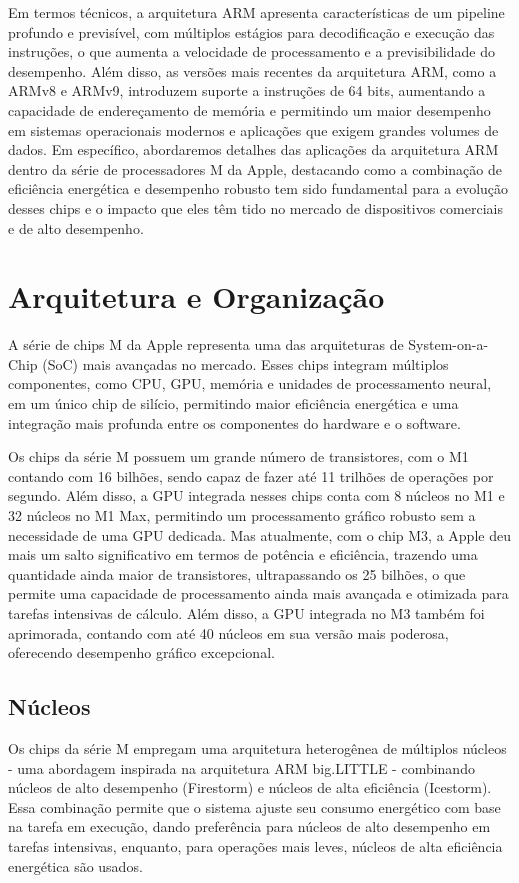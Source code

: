\documentclass[a4paper,times,12pt]{article}
\begin{document}
Em termos técnicos, a arquitetura ARM apresenta características de um pipeline profundo e previsível, com múltiplos estágios para decodificação e execução das instruções, o que aumenta a velocidade de processamento e a previsibilidade do desempenho. Além disso, as versões mais recentes da arquitetura ARM, como a ARMv8 e ARMv9, introduzem suporte a instruções de 64 bits, aumentando a capacidade de endereçamento de memória e permitindo um maior desempenho em sistemas operacionais modernos e aplicações que exigem grandes volumes de dados. Em específico, abordaremos detalhes das aplicações da arquitetura ARM dentro da série de processadores M da Apple, destacando como a combinação de eficiência energética e desempenho robusto tem sido fundamental para a evolução desses chips e o impacto que eles têm tido no mercado de dispositivos comerciais e de alto desempenho.

\newpage
\section{Arquitetura e Organização}
\hspace{+15pt} A série de chips M da Apple representa uma das arquiteturas de System-on-a-Chip (SoC) mais avançadas no mercado. Esses chips integram múltiplos componentes, como CPU, GPU, memória e unidades de processamento neural, em um único chip de silício, permitindo maior eficiência energética e uma integração mais profunda entre os componentes do hardware e o software.

Os chips da série M possuem um grande número de transistores, com o M1 contando com 16 bilhões, sendo capaz de fazer até 11 trilhões de operações por segundo. Além disso, a GPU integrada nesses chips conta com 8 núcleos no M1 e 32 núcleos no M1 Max, permitindo um processamento gráfico robusto sem a necessidade de uma GPU dedicada. Mas atualmente, com o chip M3, a Apple deu mais um salto significativo em termos de potência e eficiência, trazendo uma quantidade ainda maior de transistores, ultrapassando os 25 bilhões, o que permite uma capacidade de processamento ainda mais avançada e otimizada para tarefas intensivas de cálculo. Além disso, a GPU integrada no M3 também foi aprimorada, contando com até 40 núcleos em sua versão mais poderosa, oferecendo desempenho gráfico excepcional.

\subsection{Núcleos}
\hspace{+15pt}
Os chips da série M empregam uma arquitetura heterogênea de múltiplos núcleos - uma abordagem inspirada na arquitetura ARM big.LITTLE - combinando núcleos de alto desempenho (Firestorm) e núcleos de alta eficiência (Icestorm). Essa combinação permite que o sistema ajuste seu consumo energético com base na tarefa em execução, dando preferência para núcleos de alto desempenho em tarefas intensivas, enquanto, para operações mais leves, núcleos de alta eficiência energética são usados. 
\end{document}

